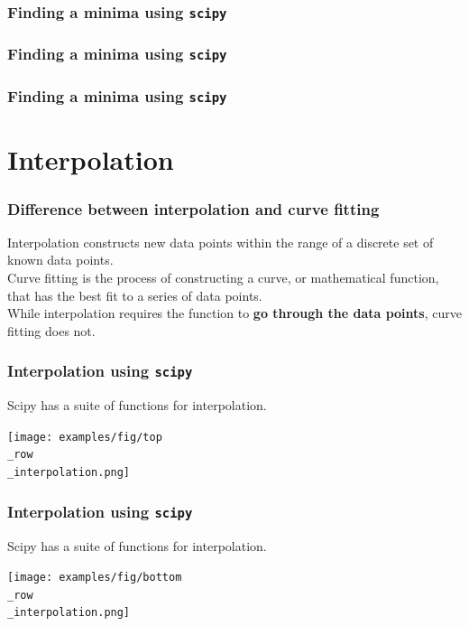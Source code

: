 \documentclass{beamer}
\begin{document}
\begin{frame}
  \frametitle{Finding a minima using \texttt{scipy}}
  
\end{frame}
\begin{frame}
  \frametitle{Finding a minima using \texttt{scipy}}
  
\end{frame}
\begin{frame}
  \frametitle{Finding a minima using \texttt{scipy}}
  
\end{frame}
\section{Interpolation}
\begin{frame}
  \frametitle{Difference between interpolation and curve fitting}
  Interpolation constructs new data points within the range of a discrete set of known data points.\\
  \vspace{5mm}
  Curve fitting is the process of constructing a curve, or mathematical function, that has the best fit to a series of data points.\\
  \vspace{5mm}
  While interpolation requires the function to \textbf{go through the data points}, curve fitting does not.\\
\end{frame}
\begin{frame}
  \frametitle{Interpolation using \texttt{scipy}}
  Scipy has a suite of functions for interpolation.\\
  \begin{center}
    \texttt{[image: examples/fig/top\\\_row\\\_interpolation.png]}
  \end{center}
\end{frame}
\begin{frame}
  \frametitle{Interpolation using \texttt{scipy}}
  Scipy has a suite of functions for interpolation.\\
  \begin{center}
    \texttt{[image: examples/fig/bottom\\\_row\\\_interpolation.png]}
  \end{center}
\end{frame}
\end{document}
